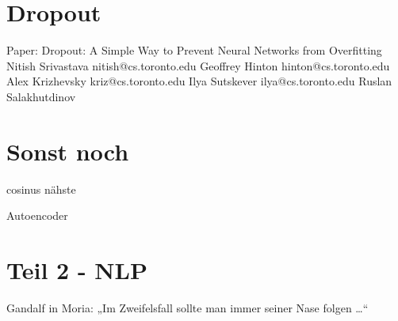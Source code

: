 \documentclass[
fontsize=12pt,					%
paper=a4,						%
twoside=true, 					%
listof=totoc, 					%
bibliography=totoc,				%
titlepage, 						%
headsepline, 					%
DIV=12,							%
BCOR=6mm,						%
cleardoublepage=empty,			%
parskip,							%
ngerman
]{scrartcl}
\begin{document}
\section{Dropout}

Paper:
Dropout: A Simple Way to Prevent Neural Networks from
Overfitting
Nitish Srivastava nitish@cs.toronto.edu
Geoffrey Hinton hinton@cs.toronto.edu
Alex Krizhevsky kriz@cs.toronto.edu
Ilya Sutskever ilya@cs.toronto.edu
Ruslan Salakhutdinov 


\section{Sonst noch}

cosinus nähste

Autoencoder

\section{Teil 2 - NLP}

Gandalf in Moria: „Im Zweifelsfall sollte man immer seiner Nase folgen …“
\end{document}
